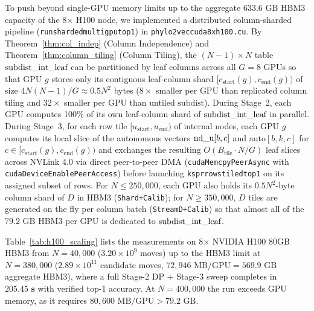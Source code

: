 \documentclass[11pt,a4paper]{article}
\makeatletter
\DeclareRobustCommand{\_}{\ifmmode\nfss@text{\textunderscore}\else\textunderscore\allowbreak\fi}
\theoremstyle{definition}
\makeatother
\begin{document}
To push beyond single-GPU memory limits up to the aggregate $633.6\text{ GB}$ HBM3 capacity of the 8$\times$ H100 node, we implemented a distributed column-sharded pipeline (\texttt{run\_sharded\_multi\_gpu\_top1}) in \texttt{phylo2vec\_cuda\_8xh100.cu}. By Theorem~\ref{thm:col_indep} (Column Independence) and Theorem~\ref{thm:column_tiling} (Column Tiling), the $(N-1) \times N$ table $\text{subdist\_int\_leaf}$ can be partitioned by leaf columns across all $G = 8$ GPUs so that GPU $g$ stores only its contiguous leaf-column shard $[c_{\text{start}}(g), c_{\text{end}}(g))$ of size $4N(N-1)/G \approx 0.5 N^2$ bytes ($8\times$ smaller per GPU than replicated column tiling and $32\times$ smaller per GPU than untiled $\text{subdist}$). During Stage~2, each GPU computes 100\% of its own leaf-column shard of $\text{subdist\_int\_leaf}$ in parallel. During Stage~3, for each row tile $[u_{\text{start}}, u_{\text{end}})$ of internal nodes, each GPU $g$ computes its local slice of the autonomous vectors $\text{nd\_u}[b, c]$ and $\text{auto}[b, k, c]$ for $c \in [c_{\text{start}}(g), c_{\text{end}}(g))$ and exchanges the resulting $O(B_{\text{tile}} \cdot N / G)$ leaf slices across NVLink 4.0 via direct peer-to-peer DMA (\texttt{cudaMemcpyPeerAsync} with \texttt{cudaDeviceEnablePeerAccess}) before launching \texttt{k\_spr\_rows\_tiled\_top1} on its assigned subset of rows. For $N \le 250{,}000$, each GPU also holds its $0.5 N^2$-byte column shard of $D$ in HBM3 (\texttt{Shard+Calib}); for $N \ge 350{,}000$, $D$ tiles are generated on the fly per column batch (\texttt{StreamD+Calib}) so that almost all of the $79.2\text{ GB}$ HBM3 per GPU is dedicated to $\text{subdist\_int\_leaf}$.

Table~\ref{tab:h100_scaling} lists the measurements on 8$\times$ NVIDIA H100 80GB HBM3 from $N = 40{,}000$ ($3.20 \times 10^9$ moves) up to the HBM3 limit at $N = 380{,}000$ ($2.89 \times 10^{11}$ candidate moves, $72{,}946\text{ MB/GPU} = 569.9\text{ GB}$ aggregate HBM3), where a full Stage-2 DP + Stage-3 sweep completes in $\mathbf{205.45\text{ s}}$ with verified top-1 accuracy. At $N = 400{,}000$ the run exceeds GPU memory, as it requires $80{,}600\text{ MB/GPU} > 79.2\text{ GB}$.
\end{document}
